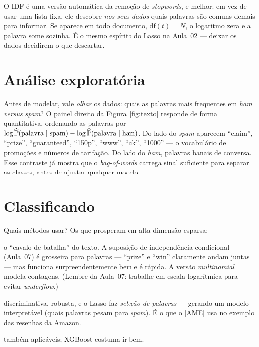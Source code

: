 \documentclass[11pt,a4paper]{article}
\begin{document}
\begin{ideia}
O IDF é uma versão automática da remoção de \emph{stopwords}, e melhor: em vez de
usar uma lista fixa, ele descobre \emph{nos seus dados} quais palavras são comuns
demais para informar. Se aparece em todo documento, $\text{df}(t)=N$, o logaritmo
zera e a palavra some sozinha. É o mesmo espírito do Lasso na Aula~02 --- deixar os
dados decidirem o que descartar.
\end{ideia}

\section{Análise exploratória}
Antes de modelar, vale \emph{olhar} os dados: quais as palavras mais frequentes em
\emph{ham} \emph{versus} \emph{spam}? O painel direito da Figura~\ref{fig:texto}
responde de forma quantitativa, ordenando as palavras por
$\log\widehat{\mathbb{P}}(\text{palavra}\mid\text{spam})-
 \log\widehat{\mathbb{P}}(\text{palavra}\mid\text{ham})$. Do lado do \emph{spam} aparecem
``claim'', ``prize'', ``guaranteed'', ``150p'', ``www'', ``uk'', ``1000'' --- o
vocabulário de promoções e números de tarifação. Do lado do \emph{ham}, palavras
banais de conversa. Esse contraste já mostra que o \emph{bag-of-words} carrega
sinal suficiente para separar as classes, antes de ajustar qualquer modelo.

\section{Classificando}
Quais métodos usar? Os que prosperam em alta dimensão esparsa:
\begin{description}[leftmargin=2.8cm,style=nextline]
  \item[Bayes ingênuo (multinomial)] o ``cavalo de batalha'' do texto. A suposição
        de independência condicional (Aula~07) é grosseira para palavras --- ``prize''
        e ``win'' claramente andam juntas --- mas funciona surpreendentemente bem e é
        rápida. A versão \emph{multinomial} modela contagens. (Lembre da Aula~07:
        trabalhe em escala logarítmica para evitar \emph{underflow}.)
  \item[Logística penalizada (Lasso/Ridge)] discriminativa, robusta, e o Lasso faz
        \emph{seleção de palavras} --- gerando um modelo interpretável (quais
        palavras pesam para \emph{spam}). É o que o [AME] usa no exemplo das resenhas
        da Amazon.
  \item[Florestas / \emph{boosting}] também aplicáveis; XGBoost costuma ir bem.
\end{description}
\end{document}
